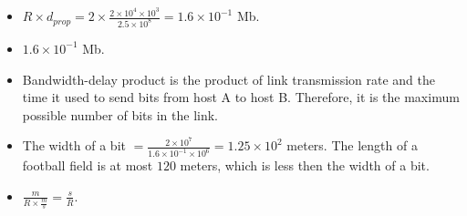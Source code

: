 \begin{pr}$ $
\begin{itemize}
\item $R\times d_{prop}=2\times\frac{2\times10^4\times10^3}{2.5\times10^8}=1.6\times10^{-1}$ Mb.
\item $1.6\times10^{-1}$ Mb.
\item Bandwidth-delay product is the product of link transmission rate and the time it used to send bits from host A to host B. Therefore, it is the maximum possible number of bits in the link.
\item The width of a bit $=\frac{2\times10^7}{1.6\times10^{-1}\times10^6}=1.25\times10^2$ meters. The length of a football field is at most $120$ meters, which is less then the width of a bit.
\item $\frac m{R\times\frac ms}=\frac sR$.
\end{itemize}
\end{pr}
